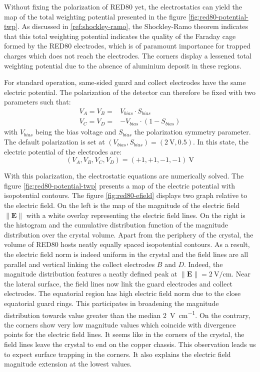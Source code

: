 Without fixing the polarization of RED80 yet, the electrostatics can yield the map of the total weighting potential presented in the figure \ref{fig:red80-potential-twp}.  As discussed in \ref{ref:shockley-ramo}, the Shockley-Ramo theorem indicates that this total weighting potential indicates the quality of the Faraday cage formed by the RED80 electrodes, which is of paramount importance for trapped charges which does not reach the electrodes.
The corners display a lessened total weighting potential due to the absence of aluminium deposit in these regions.

For standard operation, same-sided guard and collect electrodes have the same electric potential. The polarization of the detector can therefore be fixed with two parameters such that:
\begin{align}
V_A = V_B = & V_{bias} \cdot S_{bias} \\
V_C = V_D = & - V_{bias} \cdot \left( 1 - S_{bias} \right)
\end{align}
with $V_{bias}$ being the bias voltage and $S_{bias}$ the polarization symmetry parameter.
The default polarization is set at $\left( V_{bias}, S_{bias} \right) = (\SI{2}{\volt}, 0.5)$. In this state, the electric potential of the electrodes are:
\begin{equation}
(V_A, V_B, V_C, V_D) = (+1, +1, -1, -1)\ \si{\volt}
\end{equation}

With this polarization, the electrostatic equations are numerically solved. The figure \ref{fig:red80-potential-twp} presents a map of the electric potential with isopotential contours. The  figure \ref{fig:red80-efield} displays two graph relative to the electric field. On the left is the map of the magnitude of the electric field $\| \bm{E} \|$ with a white overlay representing the electric field lines. On the right is the histogram and the cumulative distribution function of the magnitude distribution over the crystal volume.
Apart from the periphery of the crystal, the volume of RED80 hosts neatly equally spaced isopotential contours. As a result, the electric field norm is indeed uniform in the crystal and the field lines are all parallel and vertical linking the collect electrodes $B$ and $D$. Indeed, the magnitude distribution features a neatly defined peak at $\| \bm{E} \| = \SI{2}{\volt\per\centi\meter}$.
Near the lateral surface, the field lines now link the guard electrodes and collect electrodes. The equatorial region has high electric field norm due to the close equatorial guard rings. This participates in broadening the magnitude distribution towards value greater than the median \SI{2}{\volt\per\centi\meter}.
On the contrary, the corners show very low magnitude values which coincide with divergence points for the electric field lines. It seems like in the corners of the crystal, the field lines leave the crystal to end on the copper chassis. This observation leads us to expect surface trapping in the corners. It also explains the electric field magnitude extension at the lowest values.

